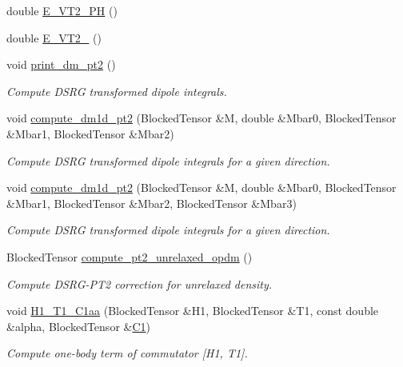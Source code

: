 \begin{DoxyCompactItemize}
\item 
double \mbox{\hyperlink{classforte_1_1_d_s_r_g___m_r_p_t2_a2285723d3fde907eb1fef4bfa295bc72}{E\+\_\+\+V\+T2\+\_\+PH}} ()
\item 
double \mbox{\hyperlink{classforte_1_1_d_s_r_g___m_r_p_t2_aa53942e2ccdb9d1097db414aff78941c}{E\+\_\+\+V\+T2\+\_}} ()
\item 
void \mbox{\hyperlink{classforte_1_1_d_s_r_g___m_r_p_t2_a998fe2003292000ad74f8babe57aab12}{print\+\_\+dm\+\_\+pt2}} ()
\begin{DoxyCompactList}\small\item\em Compute D\+S\+RG transformed dipole integrals. \end{DoxyCompactList}\item 
void \mbox{\hyperlink{classforte_1_1_d_s_r_g___m_r_p_t2_a7f7af22aa379020de56d8234a3113f2a}{compute\+\_\+dm1d\+\_\+pt2}} (Blocked\+Tensor \&M, double \&Mbar0, Blocked\+Tensor \&Mbar1, Blocked\+Tensor \&Mbar2)
\begin{DoxyCompactList}\small\item\em Compute D\+S\+RG transformed dipole integrals for a given direction. \end{DoxyCompactList}\item 
void \mbox{\hyperlink{classforte_1_1_d_s_r_g___m_r_p_t2_a5f75a8701631f236a25b0455a0cc692b}{compute\+\_\+dm1d\+\_\+pt2}} (Blocked\+Tensor \&M, double \&Mbar0, Blocked\+Tensor \&Mbar1, Blocked\+Tensor \&Mbar2, Blocked\+Tensor \&Mbar3)
\begin{DoxyCompactList}\small\item\em Compute D\+S\+RG transformed dipole integrals for a given direction. \end{DoxyCompactList}\item 
Blocked\+Tensor \mbox{\hyperlink{classforte_1_1_d_s_r_g___m_r_p_t2_af07239692f00078b36d57ce66517ad40}{compute\+\_\+pt2\+\_\+unrelaxed\+\_\+opdm}} ()
\begin{DoxyCompactList}\small\item\em Compute D\+S\+R\+G-\/\+P\+T2 correction for unrelaxed density. \end{DoxyCompactList}\item 
void \mbox{\hyperlink{classforte_1_1_d_s_r_g___m_r_p_t2_a0a07a976153924206ab3e0e9870f7ae1}{H1\+\_\+\+T1\+\_\+\+C1aa}} (Blocked\+Tensor \&H1, Blocked\+Tensor \&T1, const double \&alpha, Blocked\+Tensor \&\mbox{\hyperlink{namespaceforte_abe00ec86d0015c0f2b6ac298c6e428e4a1a2ddc2db4693cfd16d534cde5572cc1}{C1}})
\begin{DoxyCompactList}\small\item\em Compute one-\/body term of commutator \mbox{[}H1, T1\mbox{]}. \end{DoxyCompactList}\item 

\end{DoxyCompactItemize}
